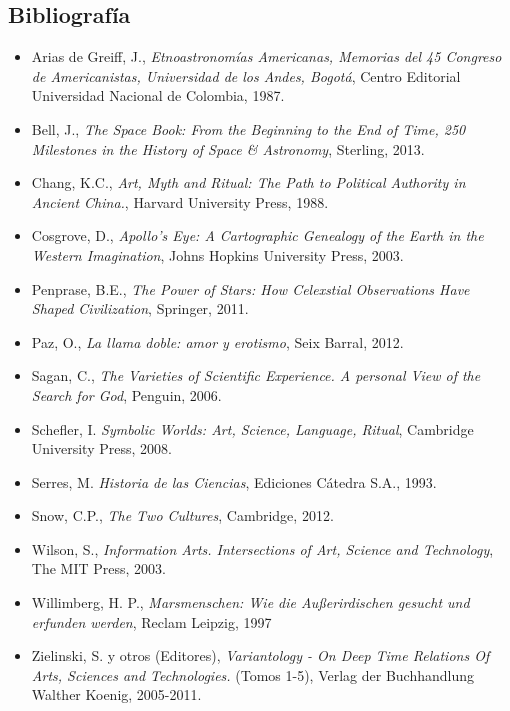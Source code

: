 \documentclass[12pt]{report}
\begin{document}
\subsection*{Bibliograf\'ia}

\begin{itemize}

\item Arias de Greiff, J., \emph{Etnoastronom\'ias Americanas, Memorias
del 45 Congreso de Americanistas, Universidad de los Andes, Bogot\'a},
  Centro Editorial Universidad Nacional de Colombia, 1987.

\item Bell, J., \emph{The Space Book: From the Beginning to the End of Time, 250
  Milestones in the History of Space \& Astronomy}, Sterling, 2013.

\item Chang, K.C., \emph{Art, Myth and Ritual: The Path to Political
  Authority in Ancient China.}, Harvard University Press, 1988.

\item Cosgrove, D., \emph{Apollo's Eye: A Cartographic Genealogy of
  the Earth in the Western Imagination}, Johns Hopkins University
  Press, 2003.

\item Penprase, B.E., \emph{The Power of Stars: How Celexstial
  Observations Have Shaped Civilization}, Springer, 2011.

\item Paz, O., \emph{La llama doble: amor y erotismo}, Seix Barral, 2012.

\item Sagan, C., \emph{The Varieties of Scientific Experience. A personal View of the Search for God}, Penguin, 2006.

\item Schefler, I. \emph{Symbolic Worlds: Art, Science, Language,
  Ritual}, Cambridge University Press, 2008.

\item Serres, M. \emph{Historia de las Ciencias}, Ediciones C\'atedra
  S.A., 1993. 

\item Snow, C.P., \emph{The Two Cultures}, Cambridge, 2012.

\item Wilson, S., \emph{Information Arts. Intersections of Art, Science
and Technology}, The MIT Press, 2003.

\item Willimberg, H. P., \emph{Marsmenschen:  Wie die Au\ss erirdischen
  gesucht und erfunden werden}, Reclam Leipzig, 1997

\item Zielinski, S. y otros (Editores), \emph{Variantology - On Deep Time
  Relations Of Arts, Sciences and Technologies.} (Tomos 1-5), Verlag
der Buchhandlung Walther Koenig, 2005-2011.  

\end{itemize}
\end{document}

